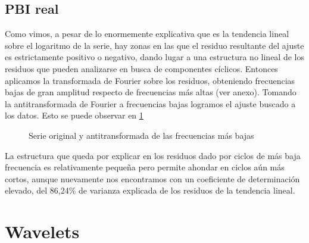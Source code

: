 \documentclass[a4paper]{article}
\begin{document}
\subsection{PBI real}
Como vimos, a pesar de lo enormemente explicativa que es la tendencia lineal sobre el logaritmo de la serie, hay zonas en las que el residuo resultante del ajuste es estrictamente positivo o negativo, dando lugar a una estructura no lineal de los residuos que pueden analizarse en busca de componentes cíclicos. Entonces aplicamos la transformada de Fourier sobre los residuos, obteniendo frecuencias bajas de gran amplitud respecto de frecuencias más altas (ver anexo). Tomando la antitransformada de Fourier a frecuencias bajas logramos el ajuste buscado a los datos. Esto se puede observar en \ref{fig:PBI_cntr_antifft}

\begin{figure}[H]
	\centering
	\caption{Serie original y antitransformada de las frecuencias más bajas} 
	\label{fig:PBI_cntr_antifft}
\end{figure}

La estructura que queda por explicar en los residuos dado por ciclos de más baja frecuencia es relativamente pequeña pero permite ahondar en ciclos aún más cortos, aunque nuevamente nos encontramos con un coeficiente de determinación elevado, del 86,24\% de varianza explicada de los residuos de la tendencia lineal.

\section{Wavelets}
\end{document}
